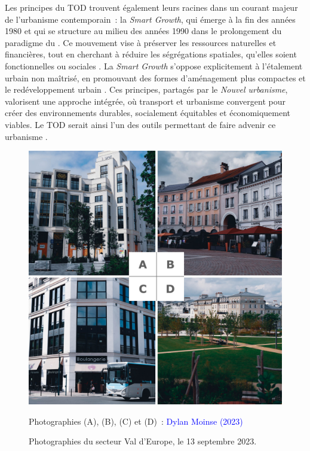 \begin{refsegment}
Les principes du \acrshort{TOD} trouvent également leurs racines dans un courant majeur de l’urbanisme contemporain~: la \textsl{Smart Growth}, qui émerge à la fin des années 1980 et qui se structure au milieu des années 1990 dans le prolongement du paradigme du  \textcolor{blue}{\autocites[7]{bentayou_transit-oriented_2015}[71]{liu_analyse_2016}}. Ce mouvement vise à préserver les ressources naturelles et financières, tout en cherchant à réduire les ségrégations spatiales, qu’elles soient fonctionnelles ou sociales \textcolor{blue}{\autocite[7]{bentayou_transit-oriented_2015}}. La \textsl{Smart Growth} s’oppose explicitement à l’étalement urbain non maîtrisé, en promouvant des formes d’aménagement plus compactes et le redéveloppement urbain \textcolor{blue}{\autocites[176]{ouellet_smart_2006}{smart_growth_network_what_2015}}. Ces principes, partagés par le \textsl{Nouvel urbanisme}, valorisent une approche intégrée, où transport et urbanisme convergent pour créer des environnements durables, socialement équitables et économiquement viables. Le \acrshort{TOD} serait ainsi l'un des outils permettant de faire advenir ce  urbanisme  \textcolor{blue}{\autocite[7]{bentayou_transit-oriented_2015}}.%

    \begin{figure}[h!]\vspace*{4pt}
        \caption{Photographies du secteur Val d'Europe, le 13 septembre 2023.}
        \label{fig-chap1:photographies-val-europe}
        \centerline{\includegraphics[width=0.75\columnwidth]{src/Figures/Chap-1/Val_Europe.jpg}}
        \vspace{5pt}
        \begin{flushright}\scriptsize{
        Photographies (A), (B), (C) et (D)~: \textcolor{blue}{Dylan Moinse (2023)}
      }\end{flushright}
    \end{figure}
    

\end{refsegment}
